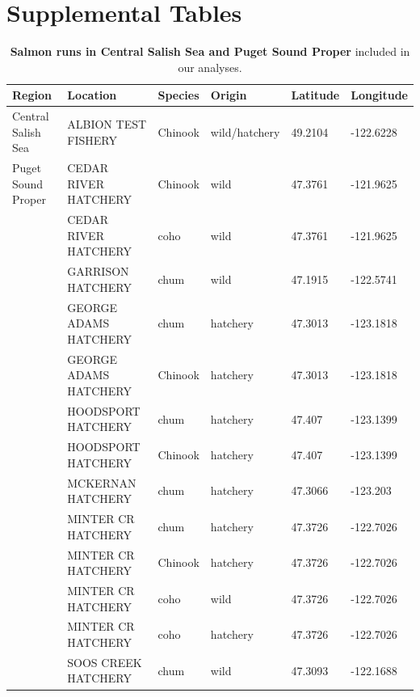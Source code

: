 \documentclass{article}
\begin{document}
\section* {Supplemental Tables}
\begin{table}[ht]
\centering
\caption{\textbf{Salmon runs in Central Salish Sea and Puget Sound Proper} included in our analyses.} 
\label{tab:salmon}
\begingroup\footnotesize
\begin{tabular}{|p{}|p{}|p{}|p{}|p{}|p{}|}
  \hline
Region & Location & Species & Origin & Latitude & Longitude \\ 
  \hline
Central Salish Sea & ALBION TEST FISHERY & Chinook & wild/hatchery & 49.2104 & -122.6228 \\ 
   \hline
Puget Sound Proper & CEDAR RIVER HATCHERY & Chinook & wild & 47.3761 & -121.9625 \\ 
   & CEDAR RIVER HATCHERY & coho & wild & 47.3761 & -121.9625 \\ 
   & GARRISON HATCHERY & chum & wild & 47.1915 & -122.5741 \\ 
   & GEORGE ADAMS HATCHERY & chum & hatchery & 47.3013 & -123.1818 \\ 
   & GEORGE ADAMS HATCHERY & Chinook & hatchery & 47.3013 & -123.1818 \\ 
   & HOODSPORT HATCHERY & chum & hatchery & 47.407 & -123.1399 \\ 
   & HOODSPORT HATCHERY & Chinook & hatchery & 47.407 & -123.1399 \\ 
   & MCKERNAN HATCHERY & chum & hatchery & 47.3066 & -123.203 \\ 
   & MINTER CR HATCHERY & chum & hatchery & 47.3726 & -122.7026 \\ 
   & MINTER CR HATCHERY & Chinook & hatchery & 47.3726 & -122.7026 \\ 
   & MINTER CR HATCHERY & coho & wild & 47.3726 & -122.7026 \\ 
   & MINTER CR HATCHERY & coho & hatchery & 47.3726 & -122.7026 \\ 
   & SOOS CREEK HATCHERY & chum & wild & 47.3093 & -122.1688 \\ 
   \hline
\end{tabular}
\endgroup
\end{table}
\end{document}
